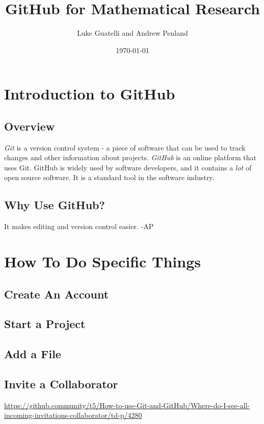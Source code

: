 \documentclass[11pt]{article}
\title{GitHub for Mathematical Research}
\author{Luke Guatelli and Andrew Penland}
\date{\today}
\begin{document}
\maketitle

\section{Introduction to GitHub}

\subsection{Overview}

\textit{Git} is a version control system - a piece of software that can be used to track changes and other information about projects. \textit{GitHub} is an online platform that uses Git. GitHub is widely used by software developers, and it contains a \textit{lot} of open source software. It is a standard tool in the software industry. 

\subsection{Why Use GitHub?}

It makes editing and version control easier. -AP

\section{How To Do Specific Things}

\subsection{Create An Account}

\subsection{Start a Project}

\subsection{Add a File}

\subsection{Invite a Collaborator} 

\url{https://github.community/t5/How-to-use-Git-and-GitHub/Where-do-I-see-all-incoming-invitations-collaborator/td-p/4280}
\end{document}
